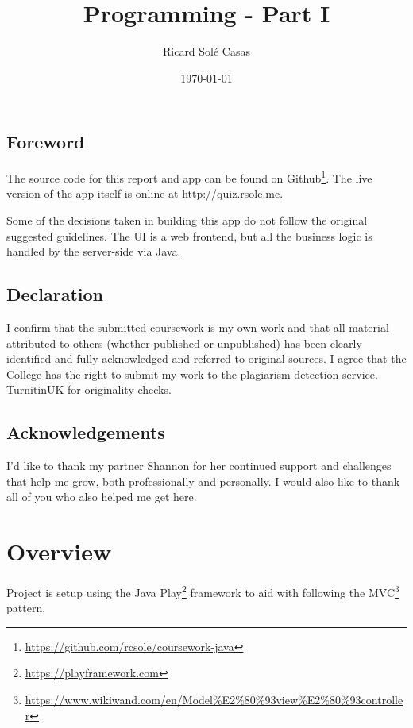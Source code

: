 \documentclass[english,a4paper,]{report}
\title{Programming - Part I}
\author{Ricard Solé Casas}
\institute{Google UK \and Ada National College for Digital Skills}
\date{\today}
\renewcommand{\href}[2]{#2\footnote{\url{#1}}}
\begin{document}
\maketitle

\vspace*{\fill}

\section*{Foreword}

The source code for this report and app can be found on
\href{https://github.com/rcsole/coursework-java}{Github}. The live
version of the app itself is online at http://quiz.rsole.me.

Some of the decisions taken in building this app do not follow the
original suggested guidelines. The UI is a web frontend, but all the
business logic is handled by the server-side via Java.

\section*{Declaration}

I confirm that the submitted coursework is my own work and that all
material attributed to others (whether published or unpublished) has
been clearly identified and fully acknowledged and referred to original
sources. I agree that the College has the right to submit my work to the
plagiarism detection service. TurnitinUK for originality checks.

\section*{Acknowledgements}

I'd like to thank my partner Shannon for her continued support and
challenges that help me grow, both professionally and personally. I
would also like to thank all of you who also helped me get here.

\vspace*{\fill}

{
\setcounter{tocdepth}{2}
\tableofcontents
}
\chapter{Overview}\label{overview}

Project is setup using the Java \href{https://playframework.com}{Play}
framework to aid with following the
\href{https://www.wikiwand.com/en/Model\%E2\%80\%93view\%E2\%80\%93controller}{MVC}
pattern.
\end{document}
